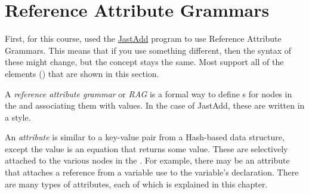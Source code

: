 \section{Reference Attribute Grammars}\label{sec:Reference_Attribute_Grammars}
First, for this course, \theauthor{} used the \href{http://jastadd.org/web/documentation/reference-manual.php}{JastAdd} program to use Reference Attribute Grammars.
This means that if you use something different, then the syntax of these might change, but the concept stays the same.
Most  support all of the elements () that are shown in this section.

\begin{definition}\label{def:Reference_Attribute_Grammar}
  A \emph{reference attribute grammar} or \emph{RAG} is a formal way to define s for nodes in the  and associating them with values.
  In the case of JastAdd, these are written in a  style.
\end{definition}

\begin{definition}[Attribute]\label{def:Attribute}
  An \emph{attribute} is similar to a key-value pair from a Hash-based data structure, except the value is an equation that returns some value.
  These are selectively attached to the various nodes in the .
  For example, there may be an attribute that attaches a reference from a variable use to the variable's declaration.
  There are many types of attributes, each of which is explained in this chapter.
\end{definition}

